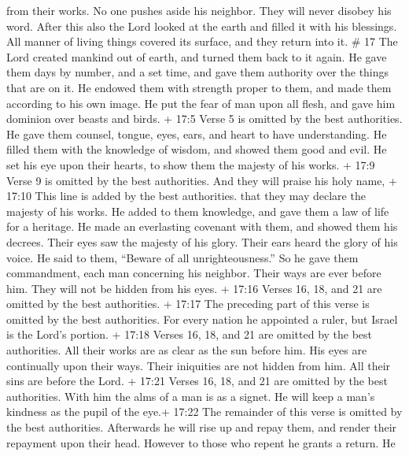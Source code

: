 from their works.  No one pushes aside his neighbor. They
will never disobey his word.  After this also the Lord
looked at the earth and filled it with his blessings.  All
manner of living things covered its surface, and they return into it. \#
17  The Lord created mankind out of earth, and turned them
back to it again.  He gave them days by number, and a set
time, and gave them authority over the things that are on it.
 He endowed them with strength proper to them, and made them
according to his own image.  He put the fear of man upon all
flesh, and gave him dominion over beasts and birds.  + 17:5
Verse 5 is omitted by the best authorities.  He gave them
counsel, tongue, eyes, ears, and heart to have understanding.
 He filled them with the knowledge of wisdom, and showed
them good and evil.  He set his eye upon their hearts, to
show them the majesty of his works.  + 17:9 Verse 9 is
omitted by the best authorities.  And they will praise his
holy name, + 17:10 This line is added by the best authorities. that they
may declare the majesty of his works.  He added to them
knowledge, and gave them a law of life for a heritage.  He
made an everlasting covenant with them, and showed them his decrees.
 Their eyes saw the majesty of his glory. Their ears heard
the glory of his voice.  He said to them, ``Beware of all
unrighteousness.'' So he gave them commandment, each man concerning his
neighbor.  Their ways are ever before him. They will not be
hidden from his eyes.  + 17:16 Verses 16, 18, and 21 are
omitted by the best authorities.  + 17:17 The preceding
part of this verse is omitted by the best authorities. For every nation
he appointed a ruler, but Israel is the Lord's portion.  +
17:18 Verses 16, 18, and 21 are omitted by the best authorities.
 All their works are as clear as the sun before him. His
eyes are continually upon their ways.  Their iniquities are
not hidden from him. All their sins are before the Lord.  +
17:21 Verses 16, 18, and 21 are omitted by the best authorities.
 With him the alms of a man is as a signet. He will keep a
man's kindness as the pupil of the eye.+ 17:22 The remainder of this
verse is omitted by the best authorities.  Afterwards he
will rise up and repay them, and render their repayment upon their head.
 However to those who repent he grants a return. He
